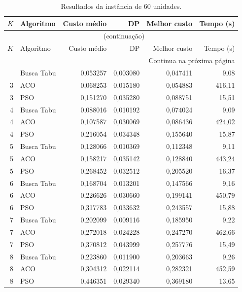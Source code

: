 \begingroup\small
\setlength{\tabcolsep}{5pt}
\begin{longtable}{rlrrrr}
\caption{Resultados da instância de 60 unidades.}\label{tab:resultados-60}\\
\toprule
$K$ & Algoritmo & Custo médio & DP & Melhor custo & Tempo (s) \\
\midrule
\endfirsthead
\multicolumn{6}{c}{\tablename~\thetable{} (continuação)}\\
\toprule
$K$ & Algoritmo & Custo médio & DP & Melhor custo & Tempo (s) \\
\midrule
\endhead
\midrule\multicolumn{6}{r}{Continua na próxima página}\\
\endfoot
\bottomrule
\endlastfoot
3 & Busca Tabu & 0,053257 & 0,003080 & 0,047411 & 9,08 \\
3 & ACO & 0,068253 & 0,015180 & 0,054883 & 416,11 \\
3 & PSO & 0,151270 & 0,035280 & 0,088751 & 15,51 \\
4 & Busca Tabu & 0,088016 & 0,010192 & 0,074024 & 9,09 \\
4 & ACO & 0,107587 & 0,030069 & 0,086436 & 424,02 \\
4 & PSO & 0,216054 & 0,034348 & 0,155640 & 15,87 \\
5 & Busca Tabu & 0,128066 & 0,010369 & 0,112348 & 9,11 \\
5 & ACO & 0,158217 & 0,035142 & 0,128840 & 443,24 \\
5 & PSO & 0,268452 & 0,032512 & 0,205520 & 16,37 \\
6 & Busca Tabu & 0,168704 & 0,013201 & 0,147566 & 9,16 \\
6 & ACO & 0,226626 & 0,030660 & 0,199141 & 450,79 \\
6 & PSO & 0,317783 & 0,033632 & 0,243557 & 15,88 \\
7 & Busca Tabu & 0,202099 & 0,009116 & 0,185950 & 9,22 \\
7 & ACO & 0,272018 & 0,024228 & 0,247270 & 462,66 \\
7 & PSO & 0,370812 & 0,043999 & 0,257776 & 15,49 \\
8 & Busca Tabu & 0,223860 & 0,011900 & 0,203663 & 9,26 \\
8 & ACO & 0,304312 & 0,022114 & 0,282321 & 452,59 \\
8 & PSO & 0,446351 & 0,029340 & 0,369180 & 13,65 \\
\end{longtable}
\endgroup

